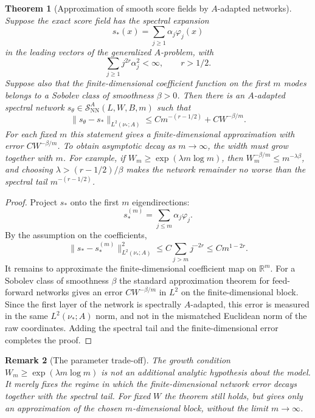 \documentclass{article}
\newtheorem{theorem}{Theorem}[section]
\newtheorem{remark}[theorem]{Remark}
\begin{document}
\begin{theorem}[Approximation of smooth score fields by \(A\)-adapted networks]
\label{thm:A-adapted-approximation}
Suppose the exact score field has the spectral expansion
\[
        s_*(x)=\sum_{j\ge1}\alpha_j \varphi_j(x)
\]
in the leading vectors of the generalized \(A\)-problem, with
\[
        \sum_{j\ge1} j^{2r}\alpha_j^2<\infty,
        \qquad r>1/2.
\]
Suppose also that the finite-dimensional coefficient function on the first \(m\)
modes belongs to a Sobolev class of smoothness \(\beta>0\). Then there is an
\(A\)-adapted spectral network
\(s_{\theta}\in\mathcal S_{\mathrm{NN}}^A(L,W,B,m)\) such that
\[
        \|s_\theta-s_*\|_{L^2(\nu_*;A)}
        \le
        C m^{-(r-1/2)}+C W^{-\beta/m}.
\]
For each fixed \(m\) this statement gives a finite-dimensional approximation with
error \(CW^{-\beta/m}\). To obtain asymptotic decay as \(m\to\infty\), the width
must grow together with \(m\). For example, if \(W_m\ge \exp(\lambda m\log m)\),
then \(W_m^{-\beta/m}\le m^{-\lambda\beta}\), and choosing
\(\lambda>(r-1/2)/\beta\) makes the network remainder no worse than the spectral
tail \(m^{-(r-1/2)}\).
\end{theorem}

\begin{proof}
Project \(s_*\) onto the first \(m\) eigendirections:
\[
        s_*^{(m)}=\sum_{j\le m}\alpha_j\varphi_j.
\]
By the assumption on the coefficients,
\[
        \|s_*-s_*^{(m)}\|_{L^2(\nu_*;A)}^2
        \le C\sum_{j>m}j^{-2r}\le C m^{1-2r}.
\]
It remains to approximate the finite-dimensional coefficient map on
\(\mathbb R^m\). For a Sobolev class of smoothness \(\beta\) the standard
approximation theorem for feed-forward networks gives an error \(CW^{-\beta/m}\)
in \(L^2\) on the finite-dimensional block. Since the first layer of the network
is spectrally \(A\)-adapted, this error is measured in the same \(L^2(\nu_*;A)\)
norm, and not in the mismatched Euclidean norm of the raw coordinates. Adding the
spectral tail and the finite-dimensional error completes the proof.
\end{proof}

\begin{remark}[The parameter trade-off]
The growth condition \(W_m\ge \exp(\lambda m\log m)\) is not an additional
analytic hypothesis about the model. It merely fixes the regime in which the
finite-dimensional network error decays together with the spectral tail. For fixed
\(W\) the theorem still holds, but gives only an approximation of the chosen
\(m\)-dimensional block, without the limit \(m\to\infty\).
\end{remark}
\end{document}

